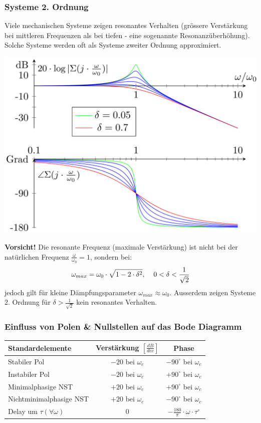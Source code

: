         \subsubsection{Systeme 2. Ordnung}
            Viele mechanischen Systeme zeigen resonantes Verhalten (grössere Verstärkung bei mittleren Frequenzen als bei tiefen - eine sogenannte Resonanzüberhöhung). Solche Systeme werden oft als Systeme zweiter Ordnung approximiert.
            \begin{center}
                \includegraphics[width = 0.8\linewidth]{images/05/Bode_2Ordnung.png}
            \end{center}
            \textbf{Vorsicht!} Die resonante Frequenz (maximale Verstärkung) ist nicht bei der natürlichen Frequenz $\frac{\omega}{\omega_0} = 1$, sondern bei:
            \[\omega_{max} = \omega_0\cdot\sqrt{1-2\cdot\delta^2}, \hspace{4mm} 0<\delta<\frac{1}{\sqrt{2}}
            \]
            jedoch gilt für kleine Dämpfungsparameter $\omega_{max}\approx\omega_0.$ 
            Ausserdem zeigen Systeme 2. Ordnung für $\delta > \frac{1}{\sqrt{2}}$ kein resonantes Verhalten.
        \subsubsection{Einfluss von Polen \& Nullstellen auf das Bode Diagramm}
            {\renewcommand{\arraystretch}{1.4}
                \begin{tabular}{l|c|c}
                Standardelemente    &   Verstärkung $[\frac{dB}{dec}]$   &   Phase\\
                \hline
                Stabiler Pol    &   $-20$ bei $\omega_c$  &   $-90^{\circ}$ bei $\omega_c$\\
                Instabiler Pol    &   $-20$ bei $\omega_c$  &   $+90^{\circ}$ bei $\omega_c$\\
                Minimalphasige NST    &   $+20$ bei $\omega_c$  &   $+90^{\circ}$ bei $\omega_c$\\
                \small{Nichtminimalphasige NST}    &   $+20$ bei $\omega_c$  &   $-90^{\circ}$ bei $\omega_c$\\
                Delay um $\tau(\forall\omega)$ &    0   &   $-\frac{180}{\pi}\cdot\omega\cdot\tau^{\circ}$
            \end{tabular}}
    
